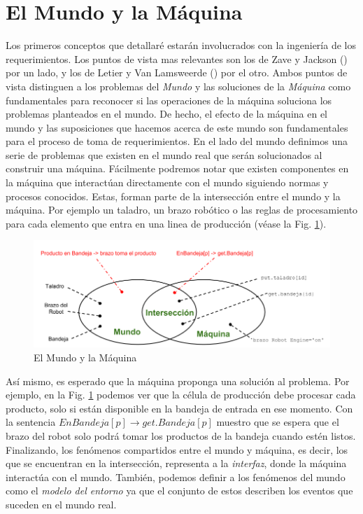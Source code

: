 \section{El Mundo y la Máquina}

Los primeros conceptos que detallaré estarán involucrados con la ingeniería de los requerimientos. Los puntos de vista
mas relevantes son los de Zave y Jackson (\cite{Zave97fourdark, Jackson:1995:SRA:210207, 5071113}) por un lado, y los de
Letier y Van Lamsweerde (\cite{879820, VanLamsweerde:2001:GRE:882477.883624}) por el otro. Ambos puntos de vista
distinguen a los problemas del \emph{Mundo} y las soluciones de la \emph{Máquina} como fundamentales para reconocer si 
las operaciones de la máquina soluciona los problemas planteados en el mundo. De hecho, el efecto de la máquina en el mundo y las
suposiciones que hacemos acerca de este mundo son fundamentales para el proceso de toma de requerimientos. En el lado
del mundo definimos una serie de problemas que existen en el mundo real que serán solucionados al construir una máquina.
Fácilmente podremos notar que existen componentes en la máquina que interactúan directamente con el mundo siguiendo
normas y procesos conocidos. Estas, forman parte de la intersección entre el mundo y la máquina. Por ejemplo un taladro,
un brazo robótico o las reglas de procesamiento para cada elemento que entra en una linea de producción (véase la Fig.
\ref{world_and_machine}).

\begin{figure}
    \centering
    \includegraphics[scale=0.45]{img/world_and_machine.png}
    \caption{El Mundo y la Máquina}
    \label{world_and_machine}
\end{figure}

Así mismo, es esperado que la máquina proponga una solución al problema. Por ejemplo, en la Fig. \ref{world_and_machine}
podemos ver que la célula de producción debe procesar cada producto, solo si están disponible en la bandeja de entrada en ese
momento. Con la sentencia $EnBandeja[p] \rightarrow get.Bandeja[p]$ muestro que se espera que el brazo del robot solo
podrá tomar los productos de la bandeja cuando estén listos. Finalizando, los fenómenos compartidos entre el mundo y
máquina, es decir, los que se encuentran en la intersección, representa a la \emph{interfaz}, donde la máquina
interactúa con el mundo. También, podemos definir a los fenómenos del mundo como el \emph{modelo del entorno} ya que el
conjunto de estos describen los eventos que suceden en el mundo real.

